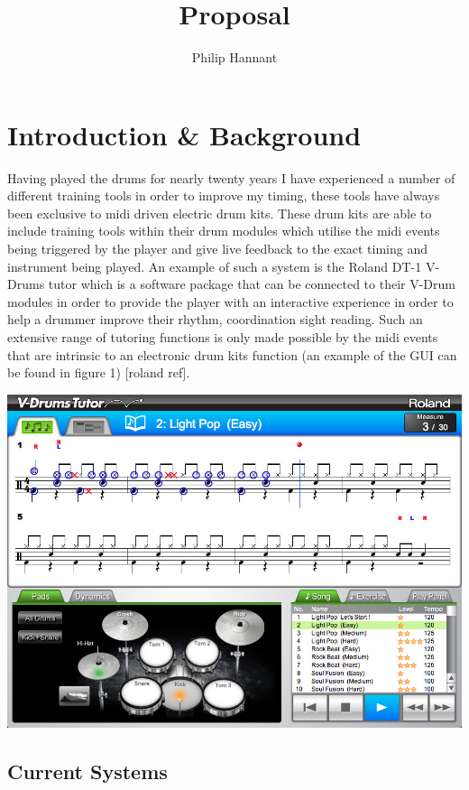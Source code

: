 \documentclass[a4paper, 11pt]{article}
\title{Proposal} \author{Philip Hannant}
\begin{document}
 \maketitle{} \section{Introduction \& Background}



Having played the drums for nearly twenty years I have experienced a number of different training tools in order to improve my timing, these tools have always been exclusive to midi driven electric drum kits. These drum kits are able to include training tools within their drum modules which utilise the midi events being triggered by the player and give live feedback to the exact timing and instrument being played. An example of such a system is the Roland DT-1 V-Drums tutor which is a software package that can be connected to their V-Drum modules in order to provide the player with an interactive experience in order to help a drummer improve their rhythm, coordination sight reading. Such an extensive range of tutoring functions is only made possible by the midi events that are intrinsic to an electronic drum kits function (an example of the GUI can be found in figure 1) [roland ref].

\includegraphics[scale=0.2]{dt-1_ss_main_notation_gal} 

\subsection{Current Systems}
\end{document}
